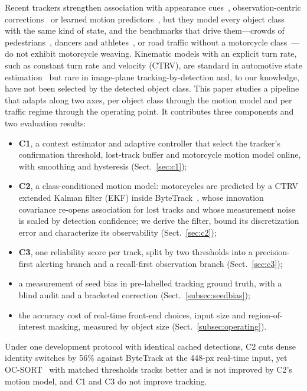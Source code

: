\documentclass[twocolumn]{svjour3}
\begin{document}
Recent trackers strengthen association with appearance
cues~\cite{Wojke2017_deepsort,Du2023_strongsort}, observation-centric
corrections~\cite{Cao2023_ocsort} or learned motion
predictors~\cite{Qin2023_motiontrack,Lv2024_diffmot}, but they model every object
class with the same kind of state, and the benchmarks that drive them---crowds
of pedestrians~\cite{Dendorfer2020_mot20}, dancers and
athletes~\cite{Sun2022_dancetrack,Cui2023_sportsmot}, or road traffic without a
motorcycle class~\cite{Wen2020_uadetrac}---do not exhibit motorcycle weaving.
Kinematic models with an explicit turn rate, such as constant turn rate and
velocity (CTRV), are standard in automotive state
estimation~\cite{Schubert2008_ctrv,BarShalom2001_estimation} but rare in
image-plane tracking-by-detection and, to our knowledge, have not been selected
by the detected object class. This paper studies a pipeline that adapts along
two axes, per object class through the motion model and per traffic regime
through the operating point. It contributes three components and two
evaluation results:
\begin{itemize}
\item \textbf{C1}, a context estimator and adaptive controller that select the
tracker's confirmation threshold, lost-track buffer and motorcycle motion model
online, with smoothing and hysteresis (Sect.~\ref{sec:c1});
\item \textbf{C2}, a class-conditioned motion model: motorcycles are predicted by
a CTRV extended Kalman filter (EKF) inside ByteTrack~\cite{Zhang2022_bytetrack},
whose innovation covariance re-opens association for lost tracks and whose
measurement noise is scaled by detection confidence; we derive the filter, bound
its discretization error and characterize its observability (Sect.~\ref{sec:c2});
\item \textbf{C3}, one reliability score per track, split by two thresholds into a
precision-first alerting branch and a recall-first observation branch
(Sect.~\ref{sec:c3});
\item a measurement of seed bias in pre-labelled tracking ground truth, with a
blind audit and a bracketed correction (Sect.~\ref{subsec:seedbias});
\item the accuracy cost of real-time front-end choices, input size and
region-of-interest masking, measured by object size (Sect.~\ref{subsec:operating}).
\end{itemize}

Under one development protocol with identical cached detections, C2 cuts dense
identity switches by 56\% against ByteTrack at the 448-px real-time input, yet
OC-SORT~\cite{Cao2023_ocsort} with matched thresholds tracks better and is not
improved by C2's motion model, and C1 and C3 do not improve tracking.
\end{document}
